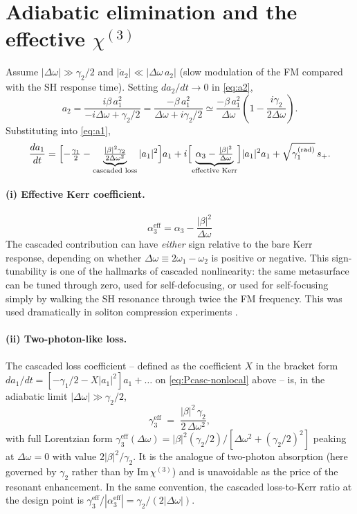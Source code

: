 \documentclass[11pt,a4paper]{article}
\newcommand{\chithree}{\chi^{(3)}}
\newcommand{\Dom}{\Delta\omega}
\begin{document}
\section{Adiabatic elimination and the effective $\chithree$}\label{sec:adiab}

Assume $|\Dom|\gg\gamma_2/2$ and $|\dot a_2|\ll|\Dom\,a_2|$ (slow
modulation of the FM compared with the SH response time).  Setting
$da_2/dt\to 0$ in \eqref{eq:a2},
\begin{equation}
  a_2 = \frac{i\beta\,a_1^2}{-i\Dom+\gamma_2/2}
      = \frac{-\beta\,a_1^2}{\Dom+i\gamma_2/2}
      \simeq \frac{-\beta\,a_1^2}{\Dom}\!\left(1-\frac{i\gamma_2}{2\Dom}\right).
\end{equation}
Substituting into \eqref{eq:a1},
\begin{equation}
  \frac{da_1}{dt}=
   \Bigl[-\tfrac{\gamma_1}{2}-\underbrace{\tfrac{|\beta|^2\gamma_2}{2\Dom^{2}}}_{\text{cascaded loss}}|a_1|^2\Bigr]a_1
   +i\Bigl[\underbrace{\alpha_3-\tfrac{|\beta|^2}{\Dom}}_{\text{effective Kerr}}\Bigr]|a_1|^2 a_1
   +\sqrt{\gamma_1^{(\text{rad})}}\,s_+ .
\end{equation}

\paragraph{(i) Effective Kerr coefficient.}
\begin{equation}
  \boxed{\;\alpha_3^{\text{eff}}=\alpha_3-\frac{|\beta|^2}{\Dom}\;}
\end{equation}
The cascaded contribution can have \emph{either} sign relative to the
bare Kerr response, depending on whether $\Dom\equiv 2\omega_1-\omega_2$
is positive or negative.  This sign-tunability is one of the hallmarks
of cascaded nonlinearity: the same metasurface can be tuned through
zero, used for self-defocusing, or used for self-focusing simply by
walking the SH resonance through twice the FM frequency.  This was used
dramatically in soliton compression experiments \cite{DeSalvo1992,Liu1999}.

\paragraph{(ii) Two-photon-like loss.}
The cascaded loss coefficient -- defined as the coefficient $X$ in the
bracket form $da_1/dt = [-\gamma_1/2 - X|a_1|^{2}]a_1 + \ldots$ on
\eqref{eq:Pcasc-nonlocal} above -- is, in the adiabatic limit
$|\Dom|\gg\gamma_2/2$,
\begin{equation}
  \gamma_3^\text{eff}\;=\;\frac{|\beta|^{2}\,\gamma_2}{2\,\Dom^{2}},
  \label{eq:gamma3-adiab}
\end{equation}
with full Lorentzian form
$\gamma_3^\text{eff}(\Dom)=|\beta|^{2}(\gamma_2/2)/[\Dom^{2}+(\gamma_2/2)^{2}]$
peaking at $\Dom=0$ with value $2|\beta|^{2}/\gamma_2$.  It is the
analogue of two-photon absorption (here governed by $\gamma_2$ rather
than by $\mathrm{Im}\,\chithree$) and is unavoidable as the price of
the resonant enhancement.  In the same convention, the cascaded
loss-to-Kerr ratio at the design point is
$\gamma_3^\text{eff}/|\alpha_3^\text{eff}|=\gamma_2/(2|\Dom|)$.
\end{document}
